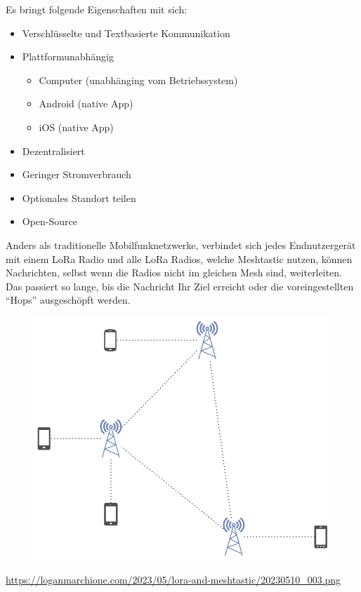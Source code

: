 \documentclass[12pt,a4paper]{article}
\begin{document}
Es bringt folgende Eigenschaften mit sich:
\begin{itemize}
	\item Verschlüsselte und Textbasierte Kommunikation
	\item Plattformunabhängig
	\begin{itemize}
		\item Computer (unabhänging vom Betriebssystem)
		\item Android (native App)
		\item iOS (native App)
	\end{itemize}
	\item Dezentralisiert
	\item Geringer Stromverbrauch
	\item Optionales Standort teilen
	\item Open-Source
\end{itemize}

Anders als traditionelle Mobilfunknetzwerke, verbindet sich jedes Endnutzergerät mit einem LoRa Radio
und alle LoRa Radios, welche Meshtastic nutzen, können Nachrichten, selbst wenn die Radios nicht im gleichen Mesh sind, weiterleiten.
Das passiert so lange, bis die Nachricht Ihr Ziel erreicht oder die voreingestellten “Hops” ausgeschöpft werden.

\begin{figure}[h]
	\includegraphics[scale=0.4]{./Bilder/Technologie/meshtastic-connections.png}
\end{figure}

\url{https://loganmarchione.com/2023/05/lora-and-meshtastic/20230510_003.png}
\end{document}
